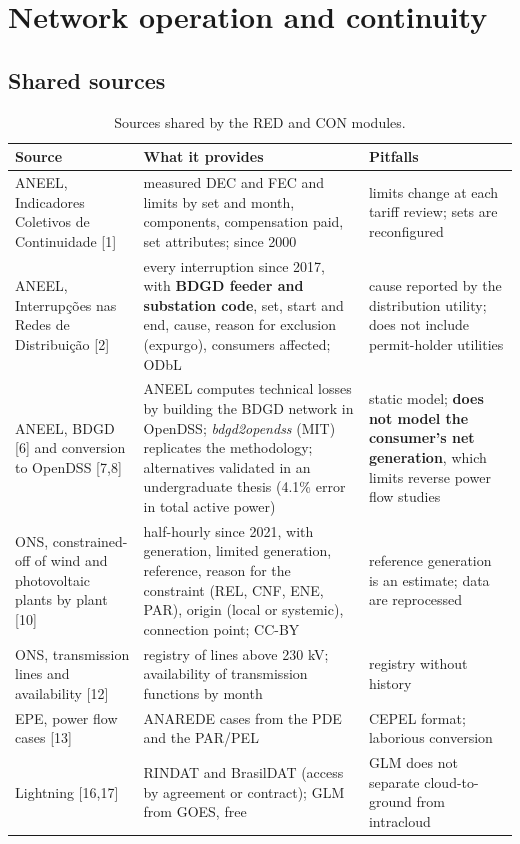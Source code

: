 
\section{Network operation and continuity}

\subsection*{Shared sources}

\begin{table}[H]
\centering\small
\caption{Sources shared by the RED and CON modules.}
\begin{tabularx}{\textwidth}{P{3.6cm} L P{3.6cm}}
\toprule
\textbf{Source} & \textbf{What it provides} & \textbf{Pitfalls} \\
\midrule
ANEEL, Indicadores Coletivos de Continuidade [1] & measured DEC and FEC and limits by set and month, components, compensation paid, set attributes; since 2000 & limits change at each tariff review; sets are reconfigured \\
ANEEL, Interrupções nas Redes de Distribuição [2] & every interruption since 2017, with \textbf{BDGD feeder and substation code}, set, start and end, cause, reason for exclusion (expurgo), consumers affected; ODbL & cause reported by the distribution utility; does not include permit-holder utilities \\
ANEEL, BDGD [6] and conversion to OpenDSS [7,8] & ANEEL computes technical losses by building the BDGD network in OpenDSS; \emph{bdgd2opendss} (MIT) replicates the methodology; alternatives validated in an undergraduate thesis (4.1\% error in total active power) & static model; \textbf{does not model the consumer's net generation}, which limits reverse power flow studies \\
ONS, constrained-off of wind and photovoltaic plants by plant [10] & half-hourly since 2021, with generation, limited generation, reference, reason for the constraint (REL, CNF, ENE, PAR), origin (local or systemic), connection point; CC-BY & reference generation is an estimate; data are reprocessed \\
ONS, transmission lines and availability [12] & registry of lines above 230 kV; availability of transmission functions by month & registry without history \\
EPE, power flow cases [13] & ANAREDE cases from the PDE and the PAR/PEL & CEPEL format; laborious conversion \\
Lightning [16,17] & RINDAT and BrasilDAT (access by agreement or contract); GLM from GOES, free & GLM does not separate cloud-to-ground from intracloud \\
\bottomrule
\end{tabularx}
\end{table}

